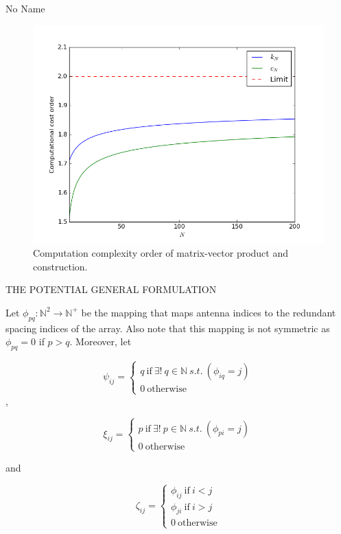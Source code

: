 \documentclass[a4paper,10pt]{article}
\begin{document}
\begin{section}{No Name}
\begin{figure}
  \includegraphics[width=\linewidth]{k_N.png}
  \caption{Computation complexity order of matrix-vector product and construction.}
\end{figure}

THE POTENTIAL GENERAL FORMULATION

Let $\phi_{pq}:\mathbb{N}^2\rightarrow\mathbb{N}^+$ be the mapping that maps antenna indices to the redundant spacing indices of the array. Also note that this mapping is not symmetric as 
$\phi_{pq} = 0$ if $p>q$. Moreover, let

\begin{equation}
\psi_{ij} = 
\begin{cases}
q~\textrm{if}~\exists! ~ q \in \mathbb{N} ~ s.t. ~(\phi_{iq} = j)\\
0~\textrm{otherwise}
\end{cases}
\end{equation},

\begin{equation}
\xi_{ij} = 
\begin{cases}
p~\textrm{if}~\exists! ~ p \in \mathbb{N} ~ s.t. ~(\phi_{pi} = j)\\
0~\textrm{otherwise}
\end{cases}
\end{equation}

and

\begin{equation}
\zeta_{ij} = 
\begin{cases}
\phi_{ij}~\textrm{if}~i<j\\
\phi_{ji}~\textrm{if}~i>j\\
0~\textrm{otherwise}
\end{cases}
\end{equation}






\end{section}
\end{document}
